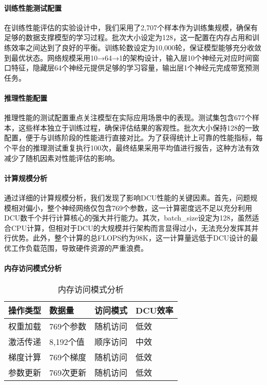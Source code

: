 \documentclass[a4paper]{article}
\begin{document}
\paragraph{训练性能测试配置}

在训练性能评估的实验设计中，我们采用了2,707个样本作为训练集规模，确保有足够的数据支撑模型的学习过程。批次大小设定为128，这一配置在内存占用和训练效率之间达到了良好的平衡。训练轮数设定为10,000轮，保证模型能够充分收敛到最优状态。网络规模采用10→64→1的架构设计，输入层10个神经元对应时间窗口特征，隐藏层64个神经元提供足够的学习容量，输出层1个神经元完成带宽预测任务。

\paragraph{推理性能配置}

推理性能的测试配置重点关注模型在实际应用场景中的表现。测试集包含677个样本，这些样本独立于训练过程，确保评估结果的客观性。批次大小保持128的一致配置，便于与训练阶段的性能进行直接对比。为了获得统计上可靠的性能指标，每个平台的推理测试重复执行100次，最终结果采用平均值进行报告，这种方法有效减少了随机因素对性能评估的影响。

\paragraph{计算规模分析}

通过详细的计算规模分析，我们发现了影响DCU性能的关键因素。首先，问题规模相对偏小，整个神经网络仅包含769个参数，这一计算密度远不足以充分利用DCU数千个并行计算核心的强大并行能力。其次，batch\_size设定为128，虽然适合CPU计算，但相对于DCU的大规模并行架构而言显得过小，无法充分发挥其并行优势。此外，整个计算的总FLOPS约为98K，这一计算量远低于DCU设计的最优工作负载范围，导致硬件资源的严重浪费。

\paragraph{内存访问模式分析}

\begin{table}[h]
\centering
\begin{tabular}{@{}llll@{}}
\toprule
操作类型 & 数据量 & 访问模式 & DCU效率 \\
\midrule
权重加载 & 769个参数 & 随机访问 & 低效 \\
激活传递 & 8,192个值 & 顺序访问 & 中效 \\
梯度计算 & 769个梯度 & 随机访问 & 低效 \\
参数更新 & 769次更新 & 随机访问 & 低效 \\
\bottomrule
\end{tabular}
\caption{内存访问模式分析}
\end{table}
\end{document}
